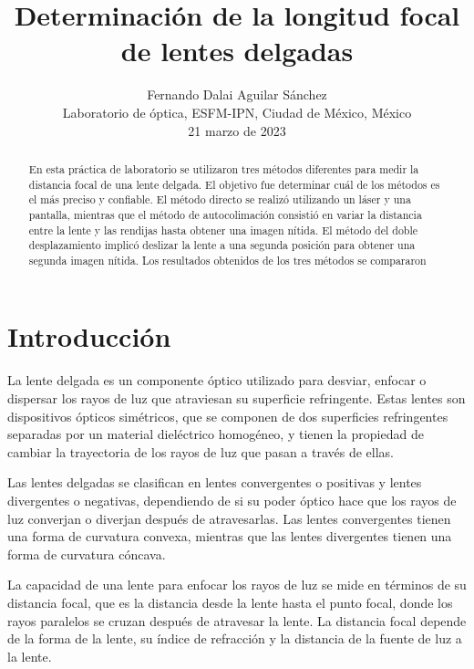 \documentclass[10pt,journal]{IEEEtran}
\begin{document}
\title{Determinación de la longitud focal de lentes delgadas}

\author{Fernando Dalai Aguilar Sánchez \\ Laboratorio de óptica, ESFM-IPN, Ciudad de México, México \\21 marzo de 2023}


\maketitle{}  

\begin{abstract}
En esta práctica de laboratorio se utilizaron tres métodos diferentes para medir la distancia focal de una lente delgada. El objetivo fue determinar cuál de los métodos es el más preciso y confiable. El método directo se realizó utilizando un láser y una pantalla, mientras que el método de autocolimación consistió en variar la distancia entre la lente y las rendijas hasta obtener una imagen nítida. El método del doble desplazamiento implicó deslizar la lente a una segunda posición para obtener una segunda imagen nítida. Los resultados obtenidos de los tres métodos se compararon
\end{abstract}  

\section{Introducción}
La lente delgada es un componente óptico utilizado para desviar, enfocar o dispersar los rayos de luz que atraviesan su superficie refringente. Estas lentes son dispositivos ópticos simétricos, que se componen de dos superficies refringentes separadas por un material dieléctrico homogéneo, y tienen la propiedad de cambiar la trayectoria de los rayos de luz que pasan a través de ellas.

Las lentes delgadas se clasifican en lentes convergentes o positivas y lentes divergentes o negativas, dependiendo de si su poder óptico hace que los rayos de luz converjan o diverjan después de atravesarlas. Las lentes convergentes tienen una forma de curvatura convexa, mientras que las lentes divergentes tienen una forma de curvatura cóncava.

La capacidad de una lente para enfocar los rayos de luz se mide en términos de su distancia focal, que es la distancia desde la lente hasta el punto focal, donde los rayos paralelos se cruzan después de atravesar la lente. La distancia focal depende de la forma de la lente, su índice de refracción y la distancia de la fuente de luz a la lente.
\end{document}
